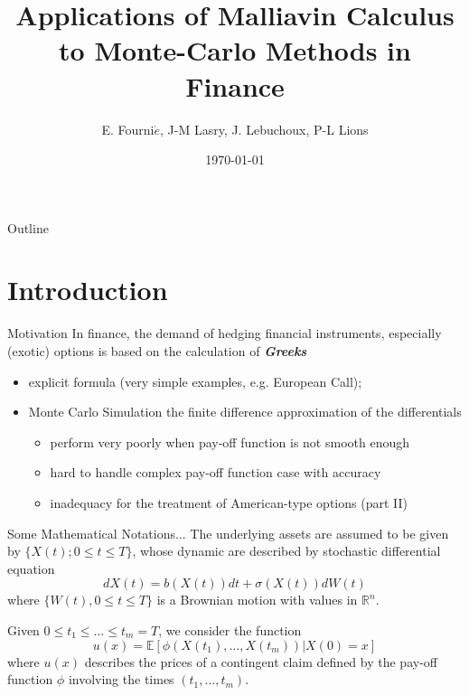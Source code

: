 \documentclass{beamer}
\title[Malliavin Calculus and MC]{Applications of Malliavin Calculus to Monte-Carlo Methods in Finance}
\author{E. Fourni$\acute{e}$, J-M Lasry, J. Lebuchoux, P-L Lions}
\date{\today}
\begin{document}
\begin{frame}
  \titlepage
\end{frame}


\begin{frame}{Outline}
  \tableofcontents
\end{frame}

\section{Introduction}


\begin{frame}{Motivation}
In finance, the demand of hedging financial instruments, especially (exotic) options is based on the calculation of {\emph \bf Greeks}
\begin{itemize}
  \item explicit formula (very simple examples, e.g. European Call);
  \item Monte Carlo Simulation the finite difference approximation of the differentials
  \begin{itemize}
      \item{perform very poorly when pay-off function is not smooth enough}
      \item{hard to handle complex pay-off function case with accuracy}
      \item{inadequacy for the treatment of American-type options (part II)}
    \end{itemize}
\end{itemize}
\end{frame}


\begin{frame}{Some Mathematical Notations...}
  The underlying assets are assumed to be given by $\{X(t); 0\leq t \leq T\}$, whose dynamic are described by stochastic differential equation
  $$
  dX(t) = b(X(t))dt + \sigma(X(t)) dW(t)
  $$
  where $\{W(t), 0\leq t \leq T\}$ is a Brownian motion with values in $\mathbb{R}^n$.

  \bigskip
  \bigskip

  Given $0 \leq t_1 \leq \ldots \leq t_m = T$, we consider the function
  $$
  u(x) = \mathbb{E}[\phi(X(t_1),\ldots,X(t_m)) | X(0) = x]
  $$
  where $u(x)$ describes the prices of a contingent claim defined by the pay-off function $\phi$ involving the times $(t_1,\ldots,t_m)$.
\end{frame}
\end{document}
